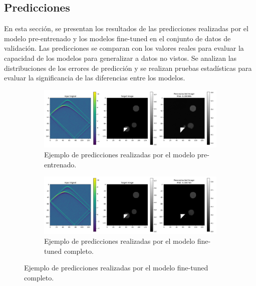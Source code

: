 \subsection{Predicciones}

En esta sección, se presentan los resultados de las predicciones realizadas por el modelo pre-entrenado y los modelos fine-tuned en el conjunto de datos de validación. Las predicciones se comparan con los valores reales para evaluar la capacidad de los modelos para generalizar a datos no vistos. Se analizan las distribuciones de los errores de predicción y se realizan pruebas estadísticas para evaluar la significancia de las diferencias entre los modelos.


\begin{figure}[H]
    \centering
    \begin{subfigure}[b]{0.8\textwidth}
        \centering
        \includegraphics[width=\textwidth]{Images/sample_solo.png}
        \caption{Ejemplo de predicciones realizadas por el modelo pre-entrenado.}
        \label{fig:sample_solo}
    \end{subfigure}

    \vspace{0.5cm}
    
    \begin{subfigure}[b]{0.8\textwidth}
        \centering
        \includegraphics[width=\textwidth]{Images/sample_sup.png}
        \caption{Ejemplo de predicciones realizadas por el modelo fine-tuned completo.}
        \label{fig:sample_sup}
    \end{subfigure}
    

\end{figure}
